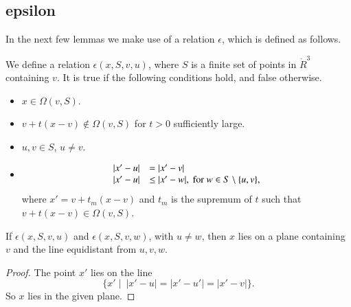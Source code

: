 \begin{tarskidata}
\begin{tarski}

\subsection{epsilon}
In the next few lemmas we make use of a relation
$\epsilon$, which is defined as follows.
\begin{definition}[$\epsilon$]
We define a relation $\epsilon(x,S,v,u)$, where $S$ is
a finite set of points in $\ring{R}^3$ containing $v$.  It is true if
the following conditions hold, and false otherwise.
\begin{itemize}
 \item $x\in \Omega(v,S)$.
 \item $v + t(x-v)\not\in\Omega(v,S)$ for
$t>0$ sufficiently large.
  \item $u,v\in S$, $u\ne v$.
 \item \begin{equation}\tlabel{fine:eps-test}
     \begin{array}{lll}
   |x'-u| &= |x'-v|\\
   |x'-u| &\le |x'-w|,\text{ for } w\in S\setminus\{u,v\},
   \end{array}
   \end{equation}
  where $x' = v+t_m (x-v)$ and $t_m$ is the supremum of $t$
  such that $v+t(x-v)\in\Omega(v,S)$.
\end{itemize}
\end{definition}
\end{tarski}


\begin{tarski}

\begin{lemma}
If $\epsilon(x,S,v,u)$ and $\epsilon(x,S,v,w)$,
with $u\ne w$, then
   $x$ lies on a plane containing $v$ and the line equidistant
from $u,v,w$.  
\end{lemma}

\begin{proof}  The point $x'$ lies on the line
   $$\{x' \mid \ |x'-u|=|x'-u'|=|x'-v|\}.$$
So $x$ lies in the given plane.
\end{proof}
\end{tarski}







\end{tarskidata}
